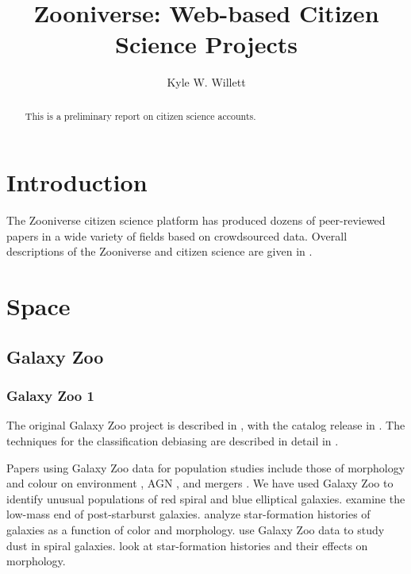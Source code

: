 \documentclass[twocolumn]{aastex6}
\begin{document}
\title{Zooniverse: Web-based Citizen Science Projects}

\author{Kyle W. Willett}

\begin{abstract}
This is a preliminary report on citizen science accounts.
\end{abstract}


\section{Introduction}

The Zooniverse citizen science platform has produced dozens of peer-reviewed papers in a wide variety of fields based on crowdsourced data. Overall descriptions of the Zooniverse and citizen science are given in \citet{cle11,for12,mas13,sim14a,mar15}.

\section{Space}

\subsection{Galaxy Zoo}

\subsubsection{Galaxy Zoo 1}

The original Galaxy Zoo project is described in \citet{lin08}, with the catalog release in \citet{lin11}. The techniques for the classification debiasing are described in detail in \citet{bam09}. 

Papers using Galaxy Zoo data for population studies include those of morphology and colour on environment \citep{bam09,ski09,hoy12}, AGN \citep{sch10a}, and mergers \citep{dar10,dar10a,dar11b,ten12}. We have used Galaxy Zoo to identify unusual populations of red spiral \citep{mas10a,cor12} and blue elliptical \citep{sch09} galaxies. \citet{won12} examine the low-mass end of post-starburst galaxies. \citet{toj13} analyze star-formation histories of galaxies as a function of color and morphology. \citet{mas10b} use Galaxy Zoo data to study dust in spiral galaxies. \citet{sch14,sme15} look at star-formation histories and their effects on morphology.
\end{document}
